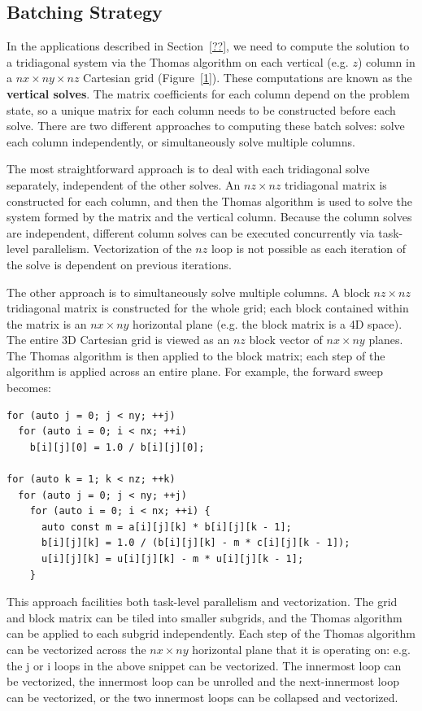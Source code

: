 \documentclass[conference]{IEEEtran}
\begin{document}
\subsection{Batching Strategy}

In the applications described in Section~\ref{??}, we need to compute the
solution to a tridiagonal system via the Thomas algorithm on each vertical
(e.g. $z$) column in a $nx \times ny \times nz$ Cartesian grid (Figure~\ref{1}).
These computations are known as the \textbf{vertical solves}. The matrix
coefficients for each column depend on the problem state, so a unique matrix
for each column needs to be constructed before each solve. There are two
different approaches to computing these batch solves: solve each column
independently, or simultaneously solve multiple columns.

The most straightforward approach is to deal with each tridiagonal solve
separately, independent of the other solves. An $nz\times nz$ tridiagonal
matrix is constructed for each column, and then the Thomas algorithm is used to
solve the system formed by the matrix and the vertical column. Because the
column solves are independent, different column solves can be executed
concurrently via task-level parallelism. Vectorization of the $nz$ loop is
not possible as each iteration of the solve is dependent on previous iterations.

The other approach is to simultaneously solve multiple columns. A block
$nz \times nz$ tridiagonal matrix is constructed for the whole grid; each block
contained within the matrix is an $nx \times ny$ horizontal plane (e.g. the
block matrix is a 4D space). The entire 3D Cartesian grid is viewed as an
$nz$ block vector of $nx \times ny$ planes. The Thomas algorithm is then
applied to the block matrix; each step of the algorithm is applied across an
entire plane. For example, the forward sweep becomes:

\begin{lstlisting}
for (auto j = 0; j < ny; ++j)
  for (auto i = 0; i < nx; ++i) 
    b[i][j][0] = 1.0 / b[i][j][0];

for (auto k = 1; k < nz; ++k)
  for (auto j = 0; j < ny; ++j)
    for (auto i = 0; i < nx; ++i) {
      auto const m = a[i][j][k] * b[i][j][k - 1];
      b[i][j][k] = 1.0 / (b[i][j][k] - m * c[i][j][k - 1]);
      u[i][j][k] = u[i][j][k] - m * u[i][j][k - 1];
    } 
\end{lstlisting}

This approach facilities both task-level parallelism and vectorization. The
grid and block matrix can be tiled into smaller subgrids, and the Thomas
algorithm can be applied to each subgrid independently. Each step of the Thomas
algorithm can be vectorized across the $nx \times ny$ horizontal plane that it
is operating on: e.g. the j or i loops in the above snippet can be vectorized.
The innermost loop can be vectorized, the innermost loop can be unrolled and
the next-innermost loop can be vectorized, or the two innermost loops can be
collapsed and vectorized.
\end{document}
